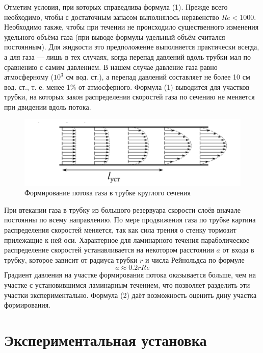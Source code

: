 \documentclass[a4paper, 10pt, twocolumn]{article}
\begin{document}
    Отметим условия, при которых справедлива формула (1). Прежде всего необходимо, чтобы с достаточным запасом выполнялось неравенство $Re < 1000$. Необходимо также, чтобы при течении не происходило существенного изменения удельного объёма газа (при выводе формулы удельный объём считался постоянным). Для жидкости это предположение выполняется практически всегда, а для газа --- лишь в тех случаях, когда перепад давлений вдоль трубки мал по сравнению с самим давлением. В нашем случае давление газа равно атмосферному ($10^3$ см вод. ст.), а перепад давлений составляет не более 10 см вод. ст., т. е. менее 1\% от атмосферного. Формула (1) выводится для участков трубки, на которых закон распределения скоростей газа по сечению не меняется при двидении вдоль потока.
    \begin{figure}[H]
        \includegraphics[width=1\linewidth]{images/potok.png}
        \begin{center}
            \caption{Формирование потока газа в трубке круглого сечения}
        \end{center}
    \end{figure}
    При втекании газа в трубку из большого резервуара скорости слоёв вначале постоянны по всему направлению. По мере продвижения газа по трубке картина распределения скоростей меняется, так как сила трения о стенку тормозит прилежащие к ней оси. Характерное для ламинарного течения параболическое распределение скоростей устанавливается на некотором расстоянии $a$ от входа в трубку, которое зависит от радиуса трубки $r$ и числа Рейнольдса по формуле 
    \begin{equation}
        a \approx 0.2rRe
    \end{equation}
    Градиент давления на участке формирования потока оказывается больше, чем на участке с установившимся ламинарным течением, что позволяет разделить эти участки экспериментально. Формула (2) даёт возможность оценить дину участка формирования.

\section{Экспериментальная установка}
\end{document}
